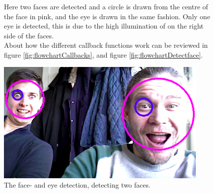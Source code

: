 \begin{figure}[H]
    \centering
    \begin{minipage}[b]{0.5\linewidth}
   Here two faces are detected and a circle is drawn from the centre of the face in pink, and the eye is drawn in the same fashion. Only one eye is detected, this is due to the high illumination of on the right side of the faces.\\
   About how the different callback functions work can be reviewed in figure \ref{fig:flowchartCallbacks}, and figure \ref{fig:flowchartDetectface}.
    \end{minipage}
    \hspace{0.2cm}
    \begin{minipage}[b]{0.47\linewidth}
    \includegraphics[width=\textwidth]{figures/detecedFace.png}
    \caption{The face- and eye detection, detecting two faces.}
    \label{fig:detectedfaces}
    \end{minipage}
\end{figure}



